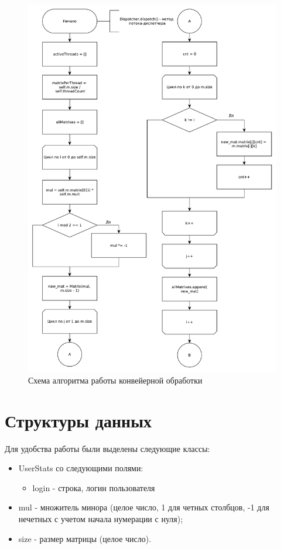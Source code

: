 \documentclass[a4paper,oneside,14pt]{extreport}
\begin{document}
\begin{figure}[H]
	\centering
	\includegraphics[width=0.85\linewidth]{images/solver_part_1}
	\caption{Схема алгоритма работы конвейерной обработки}
	\label{img:solver_1}
\end{figure}

\section{Структуры данных}
Для удобства работы были выделены следующие классы:
\begin{itemize}
	\item UserStats со следующими полями:
	\begin{itemize}
		\item login - строка, логин пользователя
	\end{itemize}
	\item mul - множитель минора (целое число, 1 для четных столбцов, -1 для нечетных с учетом начала нумерации с нуля);
	\item size - размер матрицы (целое число).
\end{itemize}
\end{document}
